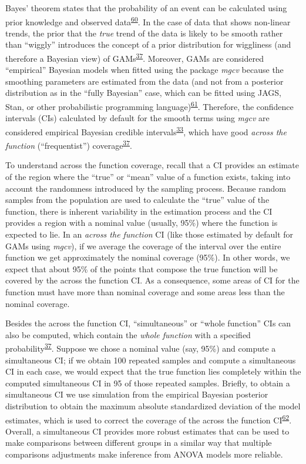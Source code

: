 \documentclass[
]{article}
\begin{document}
Bayes' theorem states that the probability of an event can be calculated using prior knowledge and observed data\textsuperscript{\protect\hyperlink{ref-mcelreath2018}{60}}. In the case of data that shows non-linear trends, the prior that the \emph{true} trend of the data is likely to be smooth rather than ``wiggly'' introduces the concept of a prior distribution for wiggliness (and therefore a Bayesian view) of GAMs\textsuperscript{\protect\hyperlink{ref-wood2017}{37}}. Moreover, GAMs are considered ``empirical'' Bayesian models when fitted using the package \emph{mgcv} because the smoothing parameters are estimated from the data (and not from a posterior distribution as in the ``fully Bayesian'' case, which can be fitted using JAGS, Stan, or other probabilistic programming language)\textsuperscript{\protect\hyperlink{ref-miller2019}{61}}. Therefore, the confidence intervals (CIs) calculated by default for the smooth terms using \emph{mgcv} are considered empirical Bayesian credible intervals\textsuperscript{\protect\hyperlink{ref-pedersen2019}{33}}, which have good \emph{across the function} (``frequentist'') coverage\textsuperscript{\protect\hyperlink{ref-wood2017}{37}}.

To understand across the function coverage, recall that a CI provides an estimate of the region where the ``true'' or ``mean'' value of a function exists, taking into account the randomness introduced by the sampling process. Because random samples from the population are used to calculate the ``true'' value of the function, there is inherent variability in the estimation process and the CI provides a region with a nominal value (usually, 95\%) where the function is expected to lie. In an \emph{across the function} CI (like those estimated by default for GAMs using \emph{mgcv}), if we average the coverage of the interval over the entire function we get approximately the nominal coverage (95\%). In other words, we expect that about 95\% of the points that compose the true function will be covered by the across the function CI. As a consequence, some areas of CI for the function must have more than nominal coverage and some areas less than the nominal coverage.

Besides the across the function CI, ``simultaneous'' or ``whole function'' CIs can also be computed, which contain the \emph{whole function} with a specified probability\textsuperscript{\protect\hyperlink{ref-wood2017}{37}}. Suppose we chose a nominal value (say, 95\%) and compute a simultaneous CI; if we obtain 100 repeated samples and compute a simultaneous CI in each case, we would expect that the true function lies completely within the computed simultaneous CI in 95 of those repeated samples. Briefly, to obtain a simultaneous CI we use simulation from the empirical Bayesian posterior distribution to obtain the maximum absolute standardized deviation of the model estimates, which is used to correct the coverage of the across the function CI\textsuperscript{\protect\hyperlink{ref-ruppert2003}{62}}. Overall, a simultaneous CI provides more robust estimates that can be used to make comparisons between different groups in a similar way that multiple comparisons adjustments make inference from ANOVA models more reliable.
\end{document}
